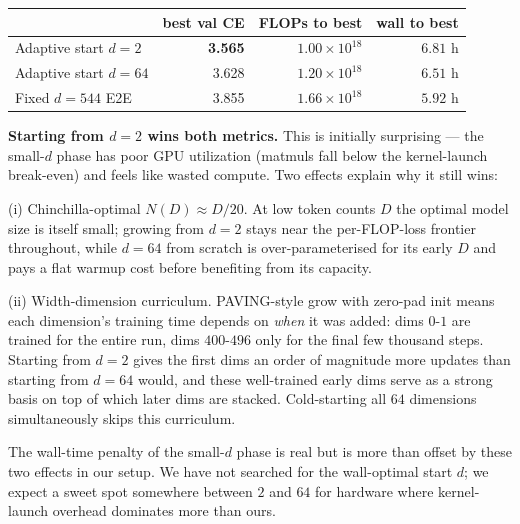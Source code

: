 \documentclass{article}
\begin{document}
\begin{center}
\begin{tabular}{lrrr}
\toprule
 & best val CE & FLOPs to best & wall to best \\
\midrule
Adaptive start $d{=}2$    & \textbf{3.565} & $1.00 \times 10^{18}$ & $6.81$ h \\
Adaptive start $d{=}64$   & 3.628          & $1.20 \times 10^{18}$ & $6.51$ h \\
Fixed $d{=}544$ E2E       & 3.855          & $1.66 \times 10^{18}$ & $5.92$ h \\
\bottomrule
\end{tabular}
\end{center}

\textbf{Starting from $d{=}2$ wins both metrics.}  This is initially
surprising --- the small-$d$ phase has poor GPU utilization (matmuls
fall below the kernel-launch break-even) and feels like wasted compute.
Two effects explain why it still wins:

(i) Chinchilla-optimal $N(D) \approx D / 20$.  At low token counts $D$
the optimal model size is itself small; growing from $d{=}2$ stays
near the per-FLOP-loss frontier throughout, while $d{=}64$ from
scratch is over-parameterised for its early $D$ and pays a flat
warmup cost before benefiting from its capacity.

(ii) Width-dimension curriculum.  PAVING-style grow with zero-pad init
means each dimension's training time depends on \emph{when} it was
added: dims $0$-$1$ are trained for the entire run, dims $400$-$496$
only for the final few thousand steps.  Starting from $d{=}2$ gives
the first dims an order of magnitude more updates than starting from
$d{=}64$ would, and these well-trained early dims serve as a strong
basis on top of which later dims are stacked.  Cold-starting all
$64$ dimensions simultaneously skips this curriculum.

The wall-time penalty of the small-$d$ phase is real but is more
than offset by these two effects in our setup.  We have not searched
for the wall-optimal start $d$; we expect a sweet spot somewhere
between $2$ and $64$ for hardware where kernel-launch overhead
dominates more than ours.
\end{document}

